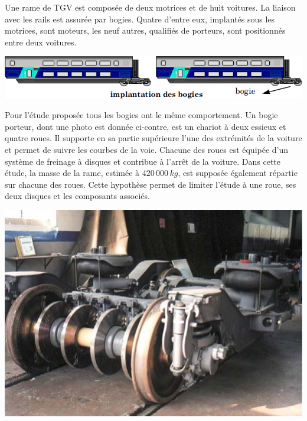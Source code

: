 \documentclass[11pt,oneside]{article}
\begin{document}
{%
%
%

Une rame de TGV est composée de deux motrices et de huit voitures.
La liaison avec les rails est assurée par bogies. Quatre d’entre eux, implantés
sous les motrices, sont moteurs, les neuf autres, qualifiés de porteurs, sont positionnés
entre deux voitures.

\begin{center}
\includegraphics[width=.8\textwidth]{png/bogies.png}
\end{center}

\begin{minipage}[c]{.6\linewidth}
Pour l’étude proposée tous les bogies ont le même comportement. Un bogie porteur, dont une photo est donnée ci-contre, est un chariot à deux essieux et quatre roues. Il supporte en sa partie supérieure l’une des extrémités de la voiture et permet de suivre les courbes de la voie. Chacune des roues est équipée d’un système de freinage à disques et contribue à l’arrêt de la voiture.
Dans cette étude, la masse de la rame, estimée à $420\,000\,kg$, est supposée également répartie sur chacune des roues. Cette hypothèse permet de limiter l’étude à une roue, ses deux disques et les composants associés.
\end{minipage}\hfill
\begin{minipage}[c]{.35\linewidth}
\begin{center}
\includegraphics[width=.95\textwidth]{png/bogie_porteur.png}
\end{center}
\end{minipage}

}
\end{document}
